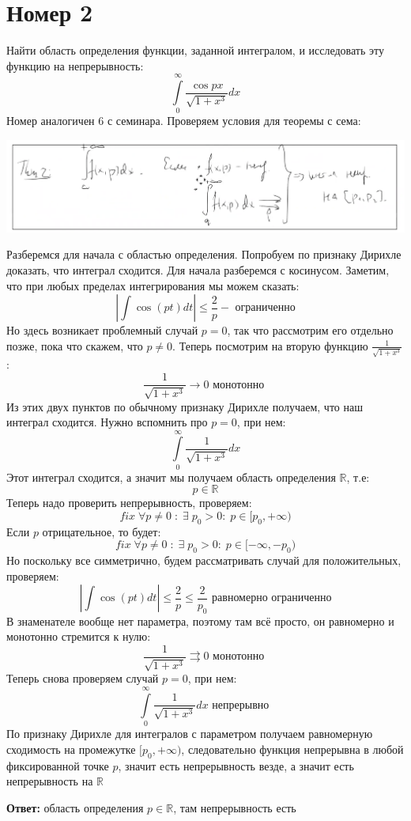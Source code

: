 \documentclass[a4paper,12pt]{article}
\begin{document}
\section*{Номер 2}
Найти область определения функции, заданной интегралом, и исследовать эту функцию на непрерывность:
\[
\int\limits_0^{\infty} \frac{\cos px}{\sqrt{1 + x^3}} dx
\]
Номер аналогичен 6 с семинара. Проверяем условия для теоремы с сема:
\begin{center}
\includegraphics[scale=0.3]{6.png}
\end{center}
Разберемся для начала с областью определения. Попробуем по признаку Дирихле доказать, что интеграл сходится. Для начала разберемся с косинусом. Заметим, что при любых пределах интегрирования мы можем сказать:
\[
\left|
\int \cos  ( pt )dt 
\right|
\leq \frac{2}{p} 
- \text{ ограниченно}
\]
Но здесь возникает проблемный случай $p = 0$, так что рассмотрим его отдельно позже, пока что скажем, что $p \neq 0 $. Теперь посмотрим на вторую функцию $\frac{1}{\sqrt{1 + x^3}}$:
\[
\frac{1}{\sqrt{1 + x^3}} \rightarrow 0 \text{ монотонно }
\]
Из этих двух пунктов по обычному признаку Дирихле получаем, что наш интеграл сходится. Нужно вспомнить про $p = 0$, при нем:
\[
\int\limits_0^{\infty} \frac{1}{\sqrt{1 + x^3}} dx
\]
Этот интеграл сходится, а значит мы получаем область определения $\mathbb{R}$, т.е:
\[
p \in \mathbb{R}
\]
Теперь надо проверить непрерывность, проверяем:
\[
fix \;  \forall p \neq 0 \; : \; \exists \;  p_0 > 0 : \;  p \in [p_0, +\infty)
\]
Если $p$ отрицательное, то будет:
\[
fix \;  \forall p \neq 0 \; : \; \exists \;  p_0 > 0 : \;  p \in [-\infty, -p_0)
\]
Но поскольку все симметрично, будем рассматривать случай для положительных, проверяем:
\[
\left|
\int \cos  ( pt )dt 
\right|
\leq \frac{2}{p} 
\leq \frac{2}{p_0}
\text{ равномерно ограниченно}
\]
В знаменателе вообще нет параметра, поэтому там всё просто, он равномерно и монотонно стремится к нулю:
\[
\frac{1}{\sqrt{1 + x^3}} \rightrightarrows 0 \text{ монотонно }
\]
Теперь снова проверяем случай $p = 0$, при нем:
\[
\int\limits_0^{\infty} \frac{1}{\sqrt{1 + x^3}} dx  \text{ непрерывно }
\]
По признаку Дирихле для интегралов с параметром получаем равномерную сходимость на промежутке $[p_0, +\infty)$, следовательно функция непрерывна в любой фиксированной точке $p$, значит есть непрерывность везде, а значит есть непрерывность на $\mathbb{R}$
\begin{center}
\textbf{Ответ:} область определения $p \in \mathbb{R}$, там непрерывность есть
\end{center}
\clearpage
\end{document}
